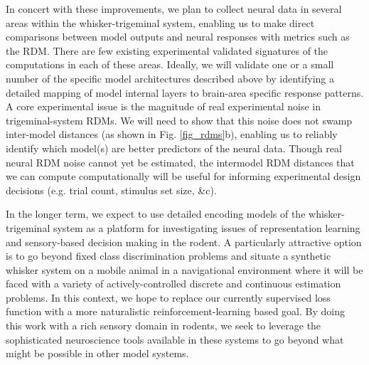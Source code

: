 In concert with these improvements, we plan to collect neural data in several areas within the whisker-trigeminal system, enabling us to make direct comparisons between model outputs and neural responses with metrics such as the RDM.  
There are few existing experimental validated signatures of the computations in each of these areas.  Ideally, we will validate one or a small number of the specific model architectures described above by identifying a detailed mapping of model internal layers to brain-area specific response patterns.
A core experimental issue is the magnitude of real experimental noise in trigeminal-system RDMs. 
We will need to show that this noise does not swamp inter-model distances (as shown in Fig. \ref{fig_rdms}b), enabling us to reliably identify which model(s) are better predictors of the neural data.
Though real neural RDM noise cannot yet be estimated, the inter­model RDM distances that we can compute computationally will be useful for informing experimental design decisions (e.g. trial count, stimulus set size, \&c).

In the longer term, we expect to use detailed encoding models of the whisker-trigeminal system as a platform for investigating issues of representation learning and sensory-based decision making in the rodent. 
A particularly attractive option is to go beyond fixed class discrimination problems and situate a synthetic whisker system on a mobile animal in a navigational environment where it will be faced with a variety of actively-controlled discrete and continuous estimation problems.
In this context, we hope to replace our currently supervised loss function with a more naturalistic reinforcement-learning based goal.
By doing this work with a rich sensory domain in rodents, we seek to leverage the sophisticated neuroscience tools available in these systems to go beyond what might be possible in other model systems.  

